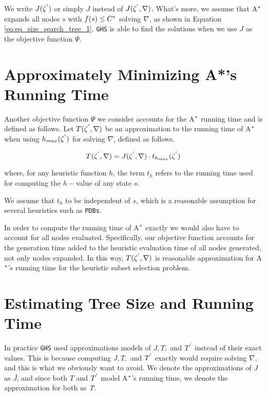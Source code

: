 We write $J(\zeta\sp{'})$ or simply $J$ instead of $J(\zeta\sp{'},\nabla)$. What's more, we assume that A$\sp{*}$ expands all nodes $s$ with $f(s) \leq C\sp{*}$ solving $\nabla$, as shown in Equation \ref{eq:eq_size_search_tree_1}. \texttt{GHS} is able to find the solutions when we use $J$ as the objective function $\Psi$.

\section{Approximately Minimizing A*'s Running Time}
\noindent
Another objective function $\Psi$ we consider accounts for the A$\sp{*}$ running time and is defined as follows. Let $T(\zeta\sp{'},\nabla)$ be an approximation to the running time of A$\sp{*}$ when using $h_{max}(\zeta\sp{'})$ for solving $\nabla$, defined as follows.

\begin{equation}
T(\zeta\sp{'}, \nabla) = J(\zeta\sp{'},\nabla) \cdot t_{h_{max}}(\zeta\sp{'})
\label{eq:eq_time_solving}
\end{equation}

where, for any heuristic function $h$, the term $t_{h}$ refers to the running time used for computing the $h-$value of any state $s$.

We assume that $t_{h}$ to be independent of $s$, which is a reasonable assumption for several heuristics such as \texttt{PDBs}.

In order to compute the running time of A$\sp{*}$ exactly we would also have to account for all nodes evaluated. Specifically, our objective function accounts for the generation time added to the heuristic evaluation time of all nodes generated, not only nodes expanded. In this way, $T(\zeta\sp{'},\nabla)$ is reasonable approximation for A$\sp{*}$'s running time for the heuristic subset selection problem.\\

\section{Estimating Tree Size and Running Time}
In  practice \texttt{GHS} used approximations models of $J,T,$ and $T\sp{'}$ instead of their exact values. This is because computing $J,T,$ and $T\sp{'}$ exactly would require solving $\nabla$, and this is what we obviously want to avoid. We denote the approximations of $J$ as \textit{\^{J}}, and since both $T$ and $T\sp{'}$ model A$\sp{*}$'s running time, we denote the approximation for both as \textit{\^{T}}.

